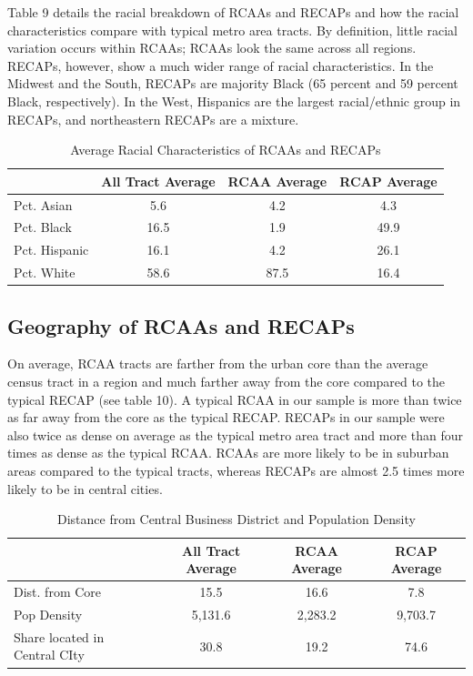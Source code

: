 \documentclass[11pt,]{article}
\begin{document}
Table 9 details the racial breakdown of RCAAs and RECAPs and how the
racial characteristics compare with typical metro area tracts. By
definition, little racial variation occurs within RCAAs; RCAAs look the
same across all regions. RECAPs, however, show a much wider range of
racial characteristics. In the Midwest and the South, RECAPs are
majority Black (65 percent and 59 percent Black, respectively). In the
West, Hispanics are the largest racial/ethnic group in RECAPs, and
northeastern RECAPs are a mixture.

\begin{table}[t]

\caption{\label{tab:table9}Average Racial Characteristics of RCAAs and RECAPs}
\centering
\begin{tabular}{lccc}
\toprule
  & All Tract Average & RCAA Average & RCAP Average\\
\midrule
Pct. Asian & 5.6 & 4.2 & 4.3\\
Pct. Black & 16.5 & 1.9 & 49.9\\
Pct. Hispanic & 16.1 & 4.2 & 26.1\\
Pct. White & 58.6 & 87.5 & 16.4\\
\bottomrule
\end{tabular}
\end{table}

\hypertarget{geography-of-rcaas-and-recaps}{%
\subsection{Geography of RCAAs and
RECAPs}\label{geography-of-rcaas-and-recaps}}

On average, RCAA tracts are farther from the urban core than the average
census tract in a region and much farther away from the core compared to
the typical RECAP (see table 10). A typical RCAA in our sample is more
than twice as far away from the core as the typical RECAP. RECAPs in our
sample were also twice as dense on average as the typical metro area
tract and more than four times as dense as the typical RCAA. RCAAs are
more likely to be in suburban areas compared to the typical tracts,
whereas RECAPs are almost 2.5 times more likely to be in central cities.

\begin{table}[t]

\caption{\label{tab:table10}Distance from Central Business District and Population Density}
\centering
\begin{tabular}{lccc}
\toprule
  & All Tract Average & RCAA Average & RCAP Average\\
\midrule
Dist. from Core & 15.5 & 16.6 & 7.8\\
Pop Density & 5,131.6 & 2,283.2 & 9,703.7\\
Share located in Central CIty & 30.8 & 19.2 & 74.6\\
\bottomrule
\end{tabular}
\end{table}
\end{document}
